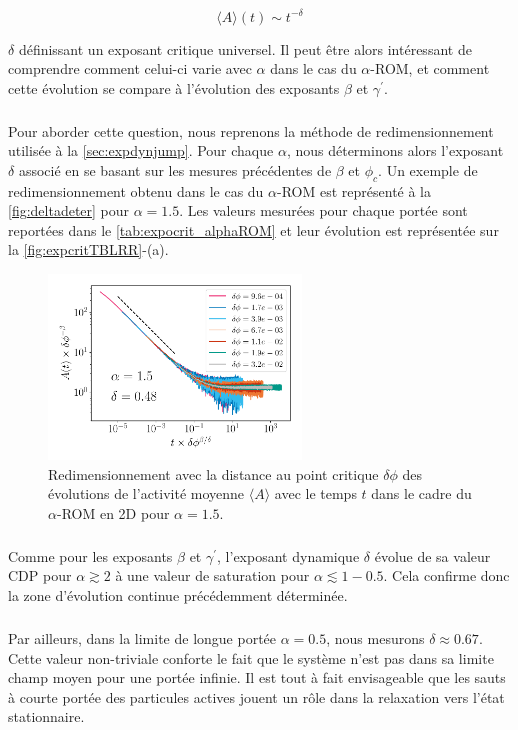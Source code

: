 \begin{equation}
	 \langle A \rangle (t) \sim t^{-\delta}
\end{equation}

\noindent $\delta$ définissant un exposant critique universel. Il peut être alors intéressant de comprendre comment celui-ci varie avec $\alpha$ dans le cas du $\alpha$-ROM, et comment cette évolution se compare à l'évolution des exposants $\beta$ et $\gamma^\prime$.

\subparagraph{}Pour aborder cette question, nous reprenons la méthode de redimensionnement utilisée à la \autoref{sec:expdynjump}. Pour chaque $\alpha$, nous déterminons alors l'exposant $\delta$ associé en se basant sur les mesures précédentes de $\beta$ et $\phi_c$. Un exemple de redimensionnement obtenu dans le cas du $\alpha$-ROM est représenté à la \autoref{fig:deltadeter} pour $\alpha = 1.5$. Les valeurs mesurées pour chaque portée sont reportées dans le \autoref{tab:expocrit_alphaROM} et leur évolution est représentée sur la \autoref{fig:expcritTBLRR}-(a).

\begin{figure}[h]
	\centering
	\includegraphics[width=0.6\textwidth]{Chapitre3/Figures/Delta/DeltaDetermination.pdf}
	\caption{Redimensionnement avec la distance au point critique $\delta\phi$ des évolutions de l'activité moyenne $\langle A \rangle$ avec le temps $t$ dans le cadre du $\alpha$-ROM en 2D pour $\alpha = 1.5$. }
	\label{fig:deltadeter}
\end{figure}

\subparagraph{}Comme pour les exposants $\beta$ et $\gamma^\prime$, l'exposant dynamique $\delta$ évolue de sa valeur CDP pour $\alpha\gtrsim 2$ à une valeur de saturation pour $\alpha \lesssim 1-0.5$. Cela confirme donc la zone d'évolution continue précédemment déterminée.

\subparagraph{}Par ailleurs, dans la limite de longue portée $\alpha=0.5$, nous mesurons $\delta\approx0.67$. Cette valeur non-triviale conforte le fait que le système n'est pas dans sa limite champ moyen pour une portée infinie. Il est tout à fait envisageable que les sauts à courte portée des particules actives jouent un rôle dans la relaxation vers l'état stationnaire.

